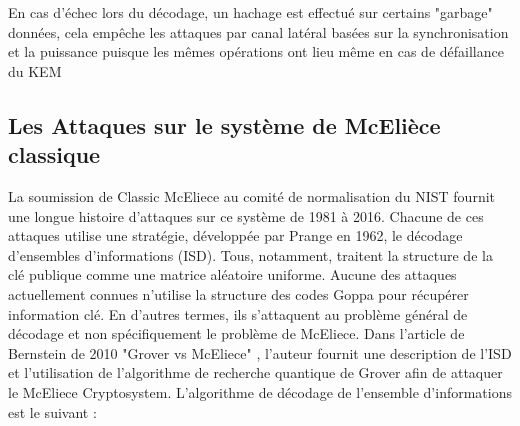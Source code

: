 \documentclass[12pt,openany]{report}
\begin{document}
En cas d'échec lors du décodage, un hachage est effectué sur certains "garbage"
données, cela empêche les attaques par canal latéral basées sur la synchronisation et la puissance puisque les mêmes opérations ont lieu même en cas de défaillance du KEM

\subsection{Les Attaques sur le système de McElièce classique}

La soumission de Classic McEliece au comité de normalisation du NIST fournit une
longue histoire d'attaques sur ce système de 1981 à 2016. Chacune de ces attaques
utilise une stratégie, développée par Prange en 1962, le décodage d'ensembles d'informations (ISD).\cite{prange62}
Tous, notamment, traitent la structure de la clé publique comme une matrice aléatoire uniforme.
Aucune des attaques actuellement connues n'utilise la structure des codes Goppa pour récupérer
information clé. En d'autres termes, ils s'attaquent au problème général de décodage et non
spécifiquement le problème de McEliece.
Dans l'article de Bernstein de 2010 "Grover vs McEliece" \cite{Bergrover3}, l'auteur fournit une description de l'ISD et l'utilisation de l'algorithme de recherche quantique de Grover afin de
attaquer le McEliece Cryptosystem. L'algorithme de décodage de l'ensemble d'informations est le suivant :\\
\end{document}
